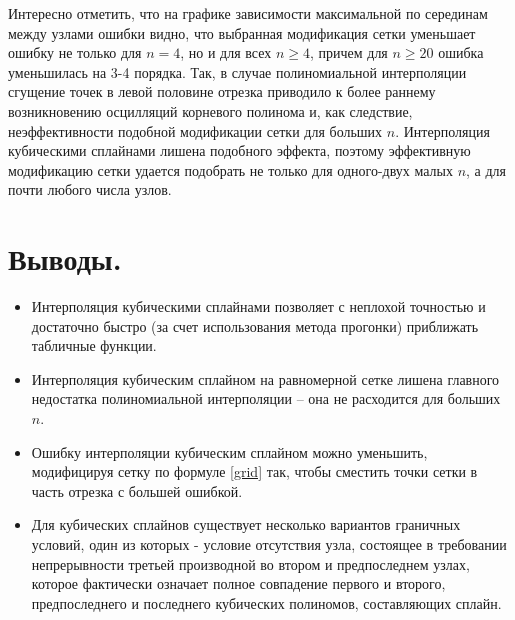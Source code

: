 \documentclass[a4paper, 12pt]{article}
\begin{document}
	Интересно отметить, что на графике зависимости максимальной по серединам между узлами ошибки видно, что выбранная модификация сетки уменьшает ошибку не только для $n=4$, но и для всех $n\geq 4$, причем для $n\geq20$ ошибка уменьшилась на 3-4 порядка. Так, в случае полиномиальной интерполяции сгущение точек в левой половине отрезка приводило к более раннему возникновению осцилляций корневого полинома и, как следствие, неэффективности подобной модификации сетки для больших $n$. Интерполяция кубическими сплайнами лишена подобного эффекта, поэтому эффективную модификацию сетки удается подобрать не только для одного-двух малых $n$, а для почти любого числа узлов.
	
	\section{Выводы.}
	
	\begin{itemize}
		\item Интерполяция кубическими сплайнами позволяет с неплохой точностью и достаточно быстро (за счет использования метода прогонки) приближать табличные функции.
		\item Интерполяция кубическим сплайном на равномерной сетке лишена главного недостатка полиномиальной интерполяции -- она не расходится для больших $n$.
		\item Ошибку интерполяции кубическим сплайном можно уменьшить, модифицируя сетку по формуле \eqref{grid} так, чтобы сместить точки сетки в часть отрезка с большей ошибкой.
		\item Для кубических сплайнов существует несколько вариантов граничных условий, один из которых - условие отсутствия узла, состоящее в требовании непрерывности третьей производной во втором и предпоследнем узлах, которое фактически означает полное совпадение первого и второго, предпоследнего и последнего кубических полиномов, составляющих сплайн.
	\end{itemize}
	
\end{document}
